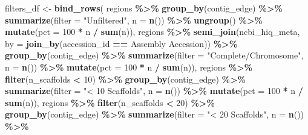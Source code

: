 \documentclass[
]{article}
\newenvironment{Shaded}{\begin{snugshade}}{\end{snugshade}}
\newcommand{\AttributeTok}[1]{\textcolor[rgb]{0.13,0.29,0.53}{#1}}
\newcommand{\DecValTok}[1]{\textcolor[rgb]{0.00,0.00,0.81}{#1}}
\newcommand{\FunctionTok}[1]{\textcolor[rgb]{0.13,0.29,0.53}{\textbf{#1}}}
\newcommand{\NormalTok}[1]{#1}
\newcommand{\OtherTok}[1]{\textcolor[rgb]{0.56,0.35,0.01}{#1}}
\newcommand{\SpecialCharTok}[1]{\textcolor[rgb]{0.81,0.36,0.00}{\textbf{#1}}}
\newcommand{\StringTok}[1]{\textcolor[rgb]{0.31,0.60,0.02}{#1}}
\begin{document}
\begin{Shaded}
\begin{Highlighting}[]
\NormalTok{filters\_df }\OtherTok{\textless{}{-}} \FunctionTok{bind\_rows}\NormalTok{(}
\NormalTok{  regions }\SpecialCharTok{\%\textgreater{}\%}
    \FunctionTok{group\_by}\NormalTok{(contig\_edge) }\SpecialCharTok{\%\textgreater{}\%}
    \FunctionTok{summarize}\NormalTok{(}\AttributeTok{filter =} \StringTok{"Unfiltered"}\NormalTok{, }\AttributeTok{n =} \FunctionTok{n}\NormalTok{()) }\SpecialCharTok{\%\textgreater{}\%}
    \FunctionTok{ungroup}\NormalTok{() }\SpecialCharTok{\%\textgreater{}\%}
    \FunctionTok{mutate}\NormalTok{(}\AttributeTok{pct =} \DecValTok{100} \SpecialCharTok{*}\NormalTok{ n }\SpecialCharTok{/} \FunctionTok{sum}\NormalTok{(n)),}
\NormalTok{  regions }\SpecialCharTok{\%\textgreater{}\%}
    \FunctionTok{semi\_join}\NormalTok{(ncbi\_hiq\_meta, }\AttributeTok{by =} \FunctionTok{join\_by}\NormalTok{(accession\_id }\SpecialCharTok{==} \StringTok{\textasciigrave{}}\AttributeTok{Assembly Accession}\StringTok{\textasciigrave{}}\NormalTok{)) }\SpecialCharTok{\%\textgreater{}\%}
    \FunctionTok{group\_by}\NormalTok{(contig\_edge) }\SpecialCharTok{\%\textgreater{}\%}
    \FunctionTok{summarize}\NormalTok{(}\AttributeTok{filter =} \StringTok{"Complete/Chromosome"}\NormalTok{, }\AttributeTok{n =} \FunctionTok{n}\NormalTok{()) }\SpecialCharTok{\%\textgreater{}\%}
    \FunctionTok{mutate}\NormalTok{(}\AttributeTok{pct =} \DecValTok{100} \SpecialCharTok{*}\NormalTok{ n }\SpecialCharTok{/} \FunctionTok{sum}\NormalTok{(n)),}
\NormalTok{  regions }\SpecialCharTok{\%\textgreater{}\%}
    \FunctionTok{filter}\NormalTok{(n\_scaffolds }\SpecialCharTok{\textless{}} \DecValTok{10}\NormalTok{) }\SpecialCharTok{\%\textgreater{}\%}
    \FunctionTok{group\_by}\NormalTok{(contig\_edge) }\SpecialCharTok{\%\textgreater{}\%}
    \FunctionTok{summarize}\NormalTok{(}\AttributeTok{filter =} \StringTok{"\textless{} 10 Scaffolds"}\NormalTok{, }\AttributeTok{n =} \FunctionTok{n}\NormalTok{()) }\SpecialCharTok{\%\textgreater{}\%}
    \FunctionTok{mutate}\NormalTok{(}\AttributeTok{pct =} \DecValTok{100} \SpecialCharTok{*}\NormalTok{ n }\SpecialCharTok{/} \FunctionTok{sum}\NormalTok{(n)),}
\NormalTok{  regions }\SpecialCharTok{\%\textgreater{}\%}
    \FunctionTok{filter}\NormalTok{(n\_scaffolds }\SpecialCharTok{\textless{}} \DecValTok{20}\NormalTok{) }\SpecialCharTok{\%\textgreater{}\%}
    \FunctionTok{group\_by}\NormalTok{(contig\_edge) }\SpecialCharTok{\%\textgreater{}\%}
    \FunctionTok{summarize}\NormalTok{(}\AttributeTok{filter =} \StringTok{"\textless{} 20 Scaffolds"}\NormalTok{, }\AttributeTok{n =} \FunctionTok{n}\NormalTok{()) }\SpecialCharTok{\%\textgreater{}\%}

\end{Highlighting}
\end{Shaded}
\end{document}
